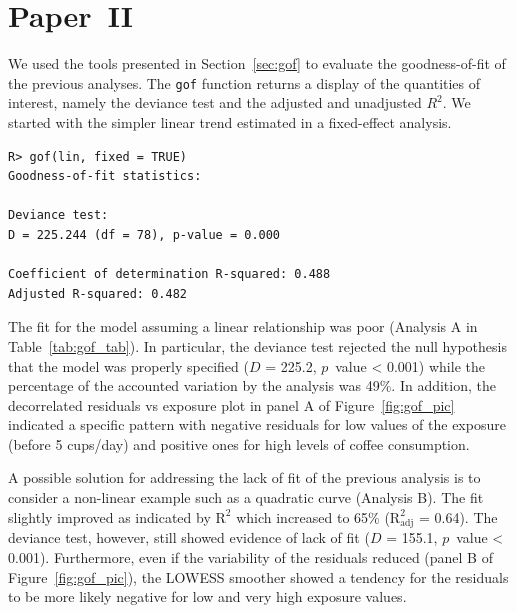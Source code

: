 \documentclass[11pt,a4paper,twoside,openany]{book}\usepackage{knitr}
\begin{document}
{{\section{Paper~II}\label{sec:res_paperII}



We used the tools presented in Section~\ref{sec:gof} to evaluate the goodness-of-fit of the previous analyses. The \texttt{gof} function returns a display of the quantities of interest, namely the deviance test and the adjusted and unadjusted $R^2$. 
We started with the simpler linear trend estimated in a fixed-effect analysis.
\begin{knitrout}\footnotesize
{}\color{fgcolor}\begin{kframe}
\begin{verbatim}
R> gof(lin, fixed = TRUE)
Goodness-of-fit statistics:

Deviance test: 
D = 225.244 (df = 78), p-value = 0.000

Coefficient of determination R-squared: 0.488 
Adjusted R-squared: 0.482
\end{verbatim}
\end{kframe}
\end{knitrout}

\noindent The fit for the model assuming a linear relationship was poor (Analysis A in Table~\ref{tab:gof_tab}). In particular, the deviance test rejected the null hypothesis that the model was properly specified ($D$ = 225.2, $p$~value < 0.001) while the percentage of the accounted variation by the analysis was 49\%. In addition, the decorrelated residuals vs exposure plot in panel A of Figure~\ref{fig:gof_pic} indicated a specific pattern with negative residuals for low values of the exposure (before 5 cups/day) and positive ones for high levels of coffee consumption.

\noindent A possible solution for addressing the lack of fit of the previous analysis is to consider a non-linear example such as a quadratic curve (Analysis B). The fit slightly improved as indicated by \textrm{$\mathrm{R^2}$} which increased to 65\% (\textrm{$\mathrm{R_{\textrm{adj}}^2}$} = 0.64). The deviance test, however, still showed evidence of lack of fit ($D$ = 155.1, $p$~value < 0.001). Furthermore, even if the variability of the residuals reduced (panel B of Figure~\ref{fig:gof_pic}), the LOWESS smoother showed a tendency for the residuals to be more likely negative for low and very high exposure values.

}}
\end{document}
